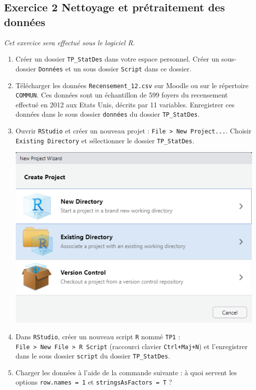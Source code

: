 \documentclass[
]{article}
\begin{document}
\subsection{Exercice 2 Nettoyage et prétraitement des
données}\label{exercice-2-nettoyage-et-pruxe9traitement-des-donnuxe9es}

\emph{Cet exercice sera effectué sous le logiciel R.}

\begin{enumerate}
\def\labelenumi{\arabic{enumi}.}
\item
  Créer un dossier \texttt{TP\_StatDes} dans votre espace personnel.
  Créer un sous-dossier \texttt{Données} et un sous dossier
  \texttt{Script} dans ce dossier.
\item
  Télécharger les données \texttt{Recensement\_12.csv} sur Moodle ou sur
  le répertoire \texttt{COMMUN}. Ces données sont un échantillon de 599
  foyers du recensement effectué en 2012 aux Etats Unis, décrits par 11
  variables. Enregistrer ces données dans le sous dossier
  \texttt{données} du dossier \texttt{TP\_StatDes}.
\item
  Ouvrir \texttt{RStudio} et créer un nouveau projet :
  \texttt{File\ \textgreater{}\ New\ Project...}. Choisir
  \texttt{Existing\ Directory} et sélectionner le dossier
  \texttt{TP\_StatDes}.

  \includegraphics{Creer_projet.png}
\item
  Dans \texttt{RStudio}, créer un nouveau script \texttt{R} nommé
  \texttt{TP1} :
  \texttt{File\ \textgreater{}\ New\ File\ \textgreater{}\ R\ Script}
  (raccourci clavier \texttt{Ctrl+Maj+N}) et l'enregistrer dans le sous
  dossier \texttt{script} du dossier \texttt{TP\_StatDes}.
\item
  Charger les données à l'aide de la commande suivante : à quoi servent
  les options \texttt{row.names\ =\ 1} et
  \texttt{stringsAsFactors\ =\ T} ?
\end{enumerate}
\end{document}
